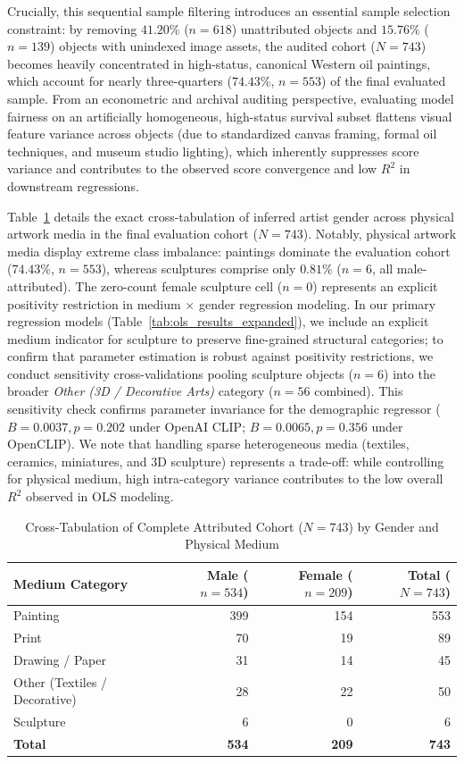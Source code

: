 \documentclass[pdflatex,sn-mathphys-num]{sn-jnl}%
\theoremstyle{thmstyleone}%
\theoremstyle{thmstyletwo}%
\theoremstyle{thmstylethree}%
\begin{document}
Crucially, this sequential sample filtering introduces an essential sample selection constraint: by removing $41.20\%$ ($n=618$) unattributed objects and $15.76\%$ ($n=139$) objects with unindexed image assets, the audited cohort ($N=743$) becomes heavily concentrated in high-status, canonical Western oil paintings, which account for nearly three-quarters ($74.43\%$, $n=553$) of the final evaluated sample. From an econometric and archival auditing perspective, evaluating model fairness on an artificially homogeneous, high-status survival subset flattens visual feature variance across objects (due to standardized canvas framing, formal oil techniques, and museum studio lighting), which inherently suppresses score variance and contributes to the observed score convergence and low $R^2$ in downstream regressions.

Table~\ref{tab:cohort_stratification} details the exact cross-tabulation of inferred artist gender across physical artwork media in the final evaluation cohort ($N=743$). Notably, physical artwork media display extreme class imbalance: paintings dominate the evaluation cohort ($74.43\%$, $n=553$), whereas sculptures comprise only $0.81\%$ ($n=6$, all male-attributed). The zero-count female sculpture cell ($n=0$) represents an explicit positivity restriction in medium $\times$ gender regression modeling. In our primary regression models (Table~\ref{tab:ols_results_expanded}), we include an explicit medium indicator for sculpture to preserve fine-grained structural categories; to confirm that parameter estimation is robust against positivity restrictions, we conduct sensitivity cross-validations pooling sculpture objects ($n=6$) into the broader \textit{Other (3D / Decorative Arts)} category ($n=56$ combined). This sensitivity check confirms parameter invariance for the demographic regressor ($B = 0.0037, p = 0.202$ under OpenAI CLIP; $B = 0.0065, p = 0.356$ under OpenCLIP). We note that handling sparse heterogeneous media (textiles, ceramics, miniatures, and 3D sculpture) represents a trade-off: while controlling for physical medium, high intra-category variance contributes to the low overall $R^2$ observed in OLS modeling.

\begin{table}[h]
\caption{Cross-Tabulation of Complete Attributed Cohort ($N=743$) by Gender and Physical Medium}
\label{tab:cohort_stratification}
\centering
\small
\begin{tabular}{lrrr}
\toprule
\textbf{Medium Category} & \textbf{Male ($n=534$)} & \textbf{Female ($n=209$)} & \textbf{Total ($N=743$)} \\
\midrule
Painting & 399 & 154 & 553 \\
Print & 70 & 19 & 89 \\
Drawing / Paper & 31 & 14 & 45 \\
Other (Textiles / Decorative) & 28 & 22 & 50 \\
Sculpture & 6 & 0 & 6 \\
\midrule
\textbf{Total} & \textbf{534} & \textbf{209} & \textbf{743} \\
\bottomrule
\end{tabular}
\end{table}
\end{document}
